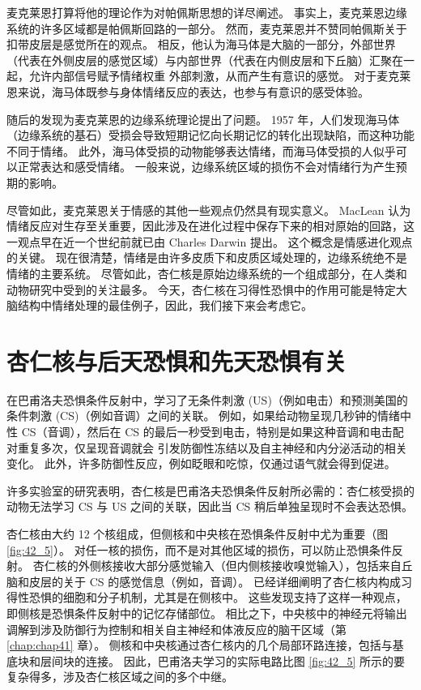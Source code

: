 麦克莱恩打算将他的理论作为对帕佩斯思想的详尽阐述。 事实上，麦克莱恩边缘系统的许多区域都是帕佩斯回路的一部分。 然而，麦克莱恩并不赞同帕佩斯关于扣带皮层是感觉所在的观点。 相反，他认为海马体是大脑的一部分，外部世界（代表在外侧皮层的感觉区域）与内部世界（代表在内侧皮层和下丘脑）汇聚在一起，允许内部信号赋予情绪权重 外部刺激，从而产生有意识的感觉。 对于麦克莱恩来说，海马体既参与身体情绪反应的表达，也参与有意识的感受体验。

随后的发现为麦克莱恩的边缘系统理论提出了问题。 1957 年，人们发现海马体（边缘系统的基石）受损会导致短期记忆向长期记忆的转化出现缺陷，而这种功能不同于情绪。 此外，海马体受损的动物能够表达情绪，而海马体受损的人似乎可以正常表达和感受情绪。 一般来说，边缘系统区域的损伤不会对情绪行为产生预期的影响。

尽管如此，麦克莱恩关于情感的其他一些观点仍然具有现实意义。 MacLean 认为情绪反应对生存至关重要，因此涉及在进化过程中保存下来的相对原始的回路，这一观点早在近一个世纪前就已由 Charles Darwin 提出。 这个概念是情感进化观点的关键。 现在很清楚，情绪是由许多皮质下和皮质区域处理的，边缘系统绝不是情绪的主要系统。 尽管如此，杏仁核是原始边缘系统的一个组成部分，在人类和动物研究中受到的关注最多。 今天，杏仁核在习得性恐惧中的作用可能是特定大脑结构中情绪处理的最佳例子，因此，我们接下来会考虑它。


\section{杏仁核与后天恐惧和先天恐惧有关}
在巴甫洛夫恐惧条件反射中，学习了无条件刺激 (US)（例如电击）和预测美国的条件刺激 (CS)（例如音调）之间的关联。 例如，如果给动物呈现几秒钟的情绪中性 CS（音调），然后在 CS 的最后一秒受到电击，特别是如果这种音调和电击配对重复多次，仅呈现音调就会 引发防御性冻结以及自主神经和内分泌活动的相关变化。 此外，许多防御性反应，例如眨眼和吃惊，仅通过语气就会得到促进。

许多实验室的研究表明，杏仁核是巴甫洛夫恐惧条件反射所必需的：杏仁核受损的动物无法学习 CS 与 US 之间的关联，因此当 CS 稍后单独呈现时不会表达恐惧。

杏仁核由大约 12 个核组成，但侧核和中央核在恐惧条件反射中尤为重要（图 \ref{fig:42_5}）。 
对任一核的损伤，而不是对其他区域的损伤，可以防止恐惧条件反射。 杏仁核的外侧核接收大部分感觉输入（但内侧核接收嗅觉输入），包括来自丘脑和皮层的关于 CS 的感觉信息（例如，音调）。 已经详细阐明了杏仁核内构成习得性恐惧的细胞和分子机制，尤其是在侧核中。 这些发现支持了这样一种观点，即侧核是恐惧条件反射中的记忆存储部位。 相比之下，中央核中的神经元将输出调解到涉及防御行为控制和相关自主神经和体液反应的脑干区域（第 \ref{chap:chap41} 章）。 侧核和中央核通过杏仁核内的几个局部环路连接，包括与基底块和层间块的连接。 因此，巴甫洛夫学习的实际电路比图 \ref{fig:42_5} 所示的要复杂得多，涉及杏仁核区域之间的多个中继。


